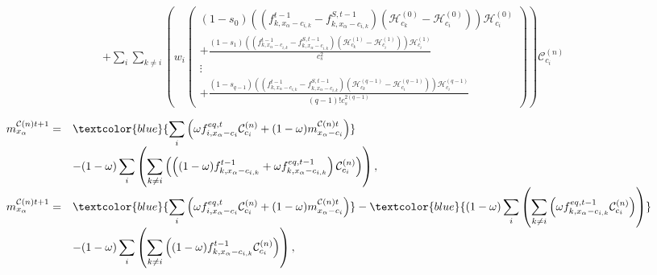 \documentclass[letterpaper,10pt,english,openany,oneside]{jupyterBook}
\begin{document}
\begin{equation*}
\begin{split}
\begin{array}{rl}
&+ \displaystyle\sum_{i} \sum_{k\neq i}\left( w_{i}\left(\begin{array}{c} (1-s_{0})\left( \left( f^{t-1}_{k,x_{\alpha}-c_{i,k}} - f^{S,t-1}_{k,x_{\alpha}-c_{i,k}}\right) \left(\mathcal{H}^{(0)}_{c_{k}}-\mathcal{H}^{(0)}_{c_{i}}\right)\right)\mathcal{H}^{(0)}_{c_{i}}\\ + \displaystyle\frac{(1-s_{1})\left( \left( f^{t-1}_{k,x_{\alpha}-c_{i,k}} - f^{S,t-1}_{k,x_{\alpha}-c_{i,k}}\right)\left(\mathcal{H}^{(1)}_{c_{k}}-\mathcal{H}^{(1)}_{c_{i}}\right)\right)\mathcal{H}^{(1)}_{c_{i}}}{c_{s}^{2}}\\  \vdots \\ + \displaystyle\frac{(1-s_{q-1})\left( \left( f^{t-1}_{k,x_{\alpha}-c_{i,k}} - f^{S,t-1}_{k,x_{\alpha}-c_{i,k}}\right)\left(\mathcal{H}^{(q-1)}_{c_{k}}-\mathcal{H}^{(q-1)}_{c_{i}}\right)\right)\mathcal{H}^{(q-1)}_{c_{i}}}{(q-1)!c_{s}^{2(q-1)}} \end{array} \right) \right)\mathcal{C}_{c_{i}}^{(n)} 
\end{array}
\end{split}
\end{equation*}\begin{equation}\label{equation:Refs/LBM-Study/FDM-Belloti/General-FDM-Single-Relaxation:SRT-FDM-Exp-Step1}
\begin{split}
\begin{array}{rl}
m_{x_{\alpha}}^{\mathcal{C}(n)t+1} = & \textcolor{blue}{\displaystyle\sum_{i}\left(\omega f_{i,x_{\alpha}-c_{i}}^{eq,t}\mathcal{C}_{c_{i}}^{(n)} + (1-\omega)m_{x_{\alpha}-c_{i}}^{\mathcal{C}(n)t} \right)} \\
&- (1-\omega) \displaystyle\sum_{i}\left( \sum_{k\neq i} \left(\left( (1-\omega)f_{k,x_{\alpha}-c_{i,k}}^{t-1}  + \omega f_{k,x_{\alpha}-c_{i,k}}^{eq,t-1} \right)\mathcal{C}_{c_{i}}^{(n)}  \right) \right), \\
m_{x_{\alpha}}^{\mathcal{C}(n)t+1} = & \textcolor{blue}{\displaystyle\sum_{i}\left(\omega f_{i,x_{\alpha}-c_{i}}^{eq,t}\mathcal{C}_{c_{i}}^{(n)} + (1-\omega)m_{x_{\alpha}-c_{i}}^{\mathcal{C}(n)t} \right)} - \textcolor{blue}{(1-\omega) \displaystyle\sum_{i}\left( \sum_{k\neq i} \left( \omega f_{k,x_{\alpha}-c_{i,k}}^{eq,t-1} \mathcal{C}_{c_{i}}^{(n)}  \right) \right)} \\
&- (1-\omega) \displaystyle\sum_{i}\left( \sum_{k\neq i} \left( (1-\omega)f_{k,x_{\alpha}-c_{i,k}}^{t-1} \mathcal{C}_{c_{i}}^{(n)}  \right) \right),
\end{array}
\end{split}
\end{equation}
\end{document}
